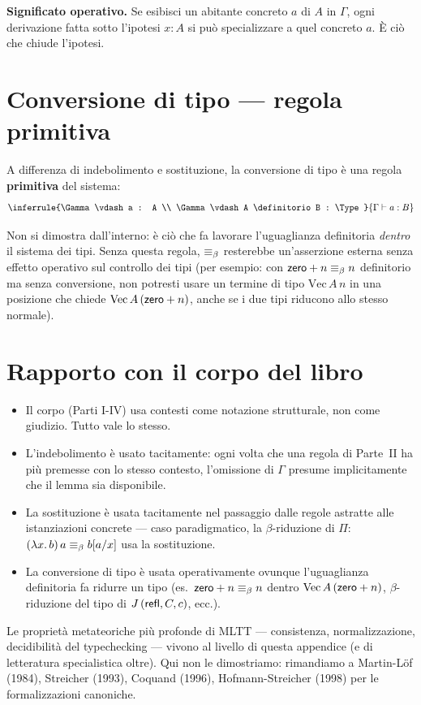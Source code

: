 \bigskip

\noindent\textbf{Significato operativo.} Se esibisci un abitante concreto $a$ di $A$ in $\Gamma$, ogni derivazione fatta sotto l'ipotesi $x : A$ si pu\`o specializzare a quel concreto $a$. \`E ci\`o che chiude l'ipotesi.

\section*{Conversione di tipo --- regola primitiva}

A differenza di indebolimento e sostituzione, la conversione di tipo \`e una regola \textbf{primitiva} del sistema:
\[
\inferrule{\Gamma \vdash a : A \\ \Gamma \vdash A \definitorio B : \Type}{\Gamma \vdash a : B}
\]

\noindent Non si dimostra dall'interno: \`e ci\`o che fa lavorare l'uguaglianza definitoria \emph{dentro} il sistema dei tipi. Senza questa regola, $\equiv_{\beta}$ resterebbe un'asserzione esterna senza effetto operativo sul controllo dei tipi (per esempio: con $\mathsf{zero} + n \equiv_{\beta} n$ definitorio ma senza conversione, non potresti usare un termine di tipo $\mathrm{Vec}\,A\,n$ in una posizione che chiede $\mathrm{Vec}\,A\,(\mathsf{zero} + n)$, anche se i due tipi riducono allo stesso normale).

\section*{Rapporto con il corpo del libro}

\begin{itemize}
\item Il corpo (Parti I-IV) usa contesti come notazione strutturale, non come giudizio. Tutto vale lo stesso.
\item L'indebolimento \`e usato tacitamente: ogni volta che una regola di Parte~II ha pi\`u premesse con lo stesso contesto, l'omissione di $\Gamma$ presume implicitamente che il lemma sia disponibile.
\item La sostituzione \`e usata tacitamente nel passaggio dalle regole astratte alle istanziazioni concrete --- caso paradigmatico, la $\beta$-riduzione di $\Pi$: $(\lambda x.\,b)\,a \equiv_{\beta} b[a/x]$ usa la sostituzione.
\item La conversione di tipo \`e usata operativamente ovunque l'uguaglianza definitoria fa ridurre un tipo (es.\ $\mathsf{zero} + n \equiv_{\beta} n$ dentro $\mathrm{Vec}\,A\,(\mathsf{zero} + n)$, $\beta$-riduzione del tipo di $J\,(\mathsf{refl}, C, c)$, ecc.).
\end{itemize}

\noindent Le propriet\`a metateoriche pi\`u profonde di MLTT --- consistenza, normalizzazione, decidibilit\`a del typechecking --- vivono al livello di questa appendice (e di letteratura specialistica oltre). Qui non le dimostriamo: rimandiamo a Martin-L\"of (1984), Streicher (1993), Coquand (1996), Hofmann-Streicher (1998) per le formalizzazioni canoniche.
